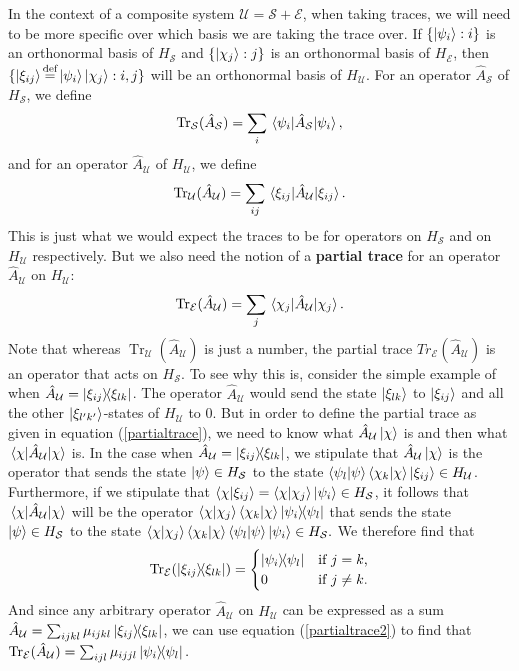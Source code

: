 \documentclass[letter, 12pt]{turabian-thesis}
\theoremstyle{hypothesis}
\newcommand\myeq{\stackrel{\mathclap{\scriptsize\mbox{def}}}{=}}
\renewcommand{\Tr}{\operatorname{Tr}}
\begin{document}
In the context of a composite system $\mathcal{U}=\mathcal{S}+\mathcal{E}$, when taking traces, we will need to be more specific over which basis we are taking the trace over.  If $\{\ket{\psi_i}:i\}$ is an orthonormal basis of $H_\mathcal{S}$ and $\{\ket{\chi_j}:j\}$ is an orthonormal basis of $H_\mathcal{E}$, then $\{\ket{\xi_{ij}}\myeq\ket{\psi_i}\ket{\chi_j}:i,j\}$ will be an orthonormal basis of $H_\mathcal{U}$. For an operator $\hat{A}_\mathcal{S}$ of $H_\mathcal{S}$, we define 
$$\Tr_\mathcal{S}(\hat{A}_\mathcal{S})=\sum_i \ev*{\hat{A}_\mathcal{S}}{\psi_i},$$
 and for an operator $\hat{A}_\mathcal{U}$ of $H_\mathcal{U}$, we define 
 $$\Tr_\mathcal{U}(\hat{A}_\mathcal{U})=\sum_{ij} \ev*{\hat{A}_\mathcal{U}}{\xi_{ij}}.$$
This is just what we would expect the traces to be for operators on $H_\mathcal{S}$ and on $H_\mathcal{U}$ respectively. But we also need the notion of a \textbf{partial trace} for an operator $\hat{A}_\mathcal{U}$ on $H_\mathcal{U}$: 
\begin{equation}\label{partialtrace} \Tr_\mathcal{E}(\hat{A}_\mathcal{U})=\sum_j \ev*{\hat{A}_\mathcal{U}}{\chi_j}.\end{equation} 
Note that whereas $\Tr_\mathcal{U}(\hat{A}_\mathcal{U})$ is just a number, the partial trace $Tr_\mathcal{E}(\hat{A}_\mathcal{U})$  is an operator that acts on $H_\mathcal{S}$. To see why this is, consider the simple example of when $\hat{A}_\mathcal{U}=\dyad{\xi_{ij}}{\xi_{lk}}$. The operator $\hat{A}_\mathcal{U}$ would send the state $\ket{\xi_{lk}}$ to $\ket{\xi_{ij}}$ and all the other $\ket{\xi_{l'k'}}$-states of $H_\mathcal{U}$ to $0$. But in order to define the partial trace as given in equation (\ref{partialtrace}), we need to know what $\hat{A}_\mathcal{U}\ket{\chi}$ is and then what $\ev*{\hat{A}_\mathcal{U}}{\chi}$ is. In the case when $\hat{A}_\mathcal{U}=\dyad{\xi_{ij}}{\xi_{lk}}$, we stipulate that $\hat{A}_\mathcal{U}\ket{\chi}$ is the operator that sends the state $\ket{\psi}\in H_\mathcal{S}$ to the state $\ip{\psi_l}{\psi}\ip{\chi_k}{\chi}\ket{\xi_{ij}}\in H_\mathcal{U}$.  Furthermore, if we stipulate that $\ip{\chi}{\xi_{ij}}=\ip{\chi}{\chi_j}\ket{\psi_i}\in H_\mathcal{S}$, it follows that $\ev*{\hat{A}_\mathcal{U}}{\chi}$ will be the operator $\ip{\chi}{\chi_j}\ip{\chi_k}{\chi}\dyad{\psi_i}{\psi_l}$ that sends  the state $\ket{\psi}\in H_\mathcal{S}$ to the state  $\ip{\chi}{\chi_j}\ip{\chi_k}{\chi}\ip{\psi_l}{\psi}\ket{\psi_i}\in H_\mathcal{S}.$ We therefore find that
\begin{equation} \label{partialtrace2}
\Tr_\mathcal{E}(\dyad{\xi_{ij}}{\xi_{lk}})=
\begin{cases} \dyad{\psi_i}{\psi_l} & \text{if $j=k$,} \\
0 & \text{if $j\neq k$}.
\end{cases}
\end{equation}
And since any arbitrary  operator $\hat{A}_\mathcal{U}$ on $H_\mathcal{U}$ can be expressed as a sum $\hat{A}_\mathcal{U}=\sum_{ijkl}\mu_{ijkl}\dyad{\xi_{ij}}{\xi_{lk}}$, we can use equation (\ref{partialtrace2}) to find that $\Tr_\mathcal{E}(\hat{A}_\mathcal{U})=\sum_{ijl}\mu_{ijjl}\dyad{\psi_i}{\psi_l}.$
\end{document}
